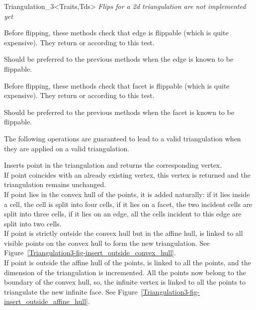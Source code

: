 \begin{ccClassTemplate}{Triangulation_3<Traits,Tds>}
\textit{Flips for a 2d triangulation are not implemented yet}

\ccGlue
{}
{Before flipping, these methods check that edge  is
flippable (which is quite expensive). They return  or
 according to this test.}

\ccGlue
{}
{Should be preferred to the previous methods when the edge is
known to be flippable.
}

\ccGlue
{}
{Before flipping, these methods check that facet  is
flippable (which is quite expensive). They return  or
 according to this test.} 

\ccGlue
{}
{Should be preferred to the previous methods when the facet is
known to be flippable.
}


The following operations are guaranteed to lead to a valid triangulation 
when they are applied on a valid triangulation.

{Inserts point  in the triangulation and returns the corresponding
 vertex.\\
If point  coincides with an already existing vertex, this 
vertex is returned and the triangulation remains unchanged.\\
If point  lies in the convex hull of the points, it is added
naturally: if it lies inside a cell, the cell is split into four
cells, if it lies on a facet, the two incident cells are split into
three cells, if it lies on an edge, all the cells incident to this
edge are split into two cells.\\
If point  is strictly outside the convex hull but in the affine
hull,  is linked to all visible points on the convex hull to
form the new triangulation. See
Figure~\ref{Triangulation3-fig-insert_outside_convex_hull}.\\  
If point  is outside the affine hull of the points,  is
linked to all the points, and the dimension of the triangulation is
incremented. All the points now belong to the boundary of the convex
hull, so, the infinite vertex is linked to all the points to
triangulate the new infinite face. See 
Figure~\ref{Triangulation3-fig-insert_outside_affine_hull}.}


\end{ccClassTemplate}
